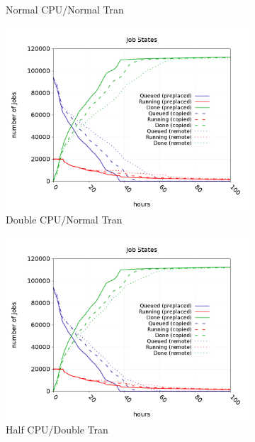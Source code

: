 \documentclass[a4paper]{jpconf}
\begin{document}
\begin{figure}
\begin{subfigure}{0.3\textwidth}
    \caption{Normal CPU/Normal Tran}
  \end{subfigure}
  \begin{subfigure}{0.3\textwidth}
    \includegraphics[width=\textwidth]{figures/FP0_RP1CPU.png}
    \caption{Double CPU/Normal Tran}
  \end{subfigure}
  \begin{subfigure}{0.3\textwidth}
    \includegraphics[width=\textwidth]{figures/FP1_RM1CPU.png}
    \caption{Half CPU/Double Tran}
  \end{subfigure}
  \begin{subfigure}{0.3\textwidth}

\end{subfigure}
\end{figure}
\end{document}
